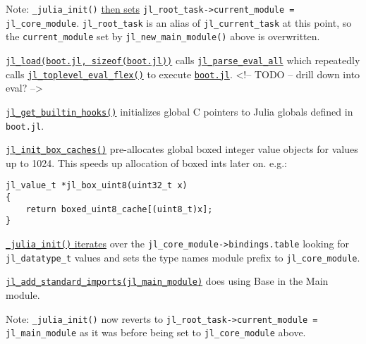 Note: \texttt{\_julia\_init()} \href{https://github.com/JuliaLang/julia/blob/master/src/init.c}{then sets} \texttt{jl\_root\_task->current\_module = jl\_core\_module}. \texttt{jl\_root\_task} is an alias of \texttt{jl\_current\_task} at this point, so the \texttt{current\_module} set by \texttt{jl\_new\_main\_module()} above is overwritten.



\href{https://github.com/JuliaLang/julia/blob/master/src/init.c}{\texttt{jl\_load({\textquotedbl}boot.jl{\textquotedbl}, sizeof({\textquotedbl}boot.jl{\textquotedbl}))}} calls \href{https://github.com/JuliaLang/julia/blob/master/src/ast.c}{\texttt{jl\_parse\_eval\_all}} which repeatedly calls \href{https://github.com/JuliaLang/julia/blob/master/src/toplevel.c}{\texttt{jl\_toplevel\_eval\_flex()}} to execute \href{https://github.com/JuliaLang/julia/blob/master/base/boot.jl}{\texttt{boot.jl}}. <!– TODO – drill down into eval? –>



\href{https://github.com/JuliaLang/julia/blob/master/src/init.c}{\texttt{jl\_get\_builtin\_hooks()}} initializes global C pointers to Julia globals defined in \texttt{boot.jl}.



\href{https://github.com/JuliaLang/julia/blob/master/src/datatype.c}{\texttt{jl\_init\_box\_caches()}} pre-allocates global boxed integer value objects for values up to 1024. This speeds up allocation of boxed ints later on. e.g.:




\begin{lstlisting}
jl_value_t *jl_box_uint8(uint32_t x)
{
    return boxed_uint8_cache[(uint8_t)x];
}
\end{lstlisting}



\href{https://github.com/JuliaLang/julia/blob/master/src/init.c}{\texttt{\_julia\_init()} iterates} over the \texttt{jl\_core\_module->bindings.table} looking for \texttt{jl\_datatype\_t} values and sets the type name{\textquotesingle}s module prefix to \texttt{jl\_core\_module}.



\href{https://github.com/JuliaLang/julia/blob/master/src/toplevel.c}{\texttt{jl\_add\_standard\_imports(jl\_main\_module)}} does {\textquotedbl}using Base{\textquotedbl} in the {\textquotedbl}Main{\textquotedbl} module.



Note: \texttt{\_julia\_init()} now reverts to \texttt{jl\_root\_task->current\_module = jl\_main\_module} as it was before being set to \texttt{jl\_core\_module} above.



